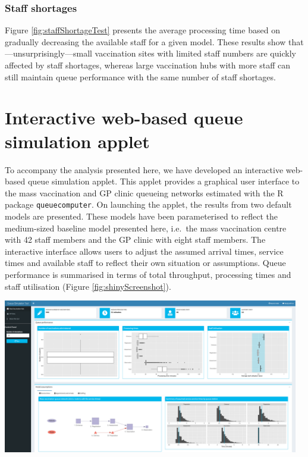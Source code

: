 \documentclass{article}
\let\origfigure\figure
\let\endorigfigure\endfigure
\renewenvironment{figure}[1][2] {
    \expandafter\origfigure\expandafter[H]
} {
    \endorigfigure
}
\begin{document}
\hypertarget{staff-shortages}{%
\subsubsection{Staff shortages}\label{staff-shortages}}

Figure \ref{fig:staffShortageTest} presents the average processing time
based on gradually decreasing the available staff for a given model.
These results show that---unsurprisingly---small vaccination sites with
limited staff numbers are quickly affected by staff shortages, whereas
large vaccination hubs with more staff can still maintain queue
performance with the same number of staff shortages.

\hypertarget{interactive-web-based-queue-simulation-applet}{%
\section{Interactive web-based queue simulation
applet}\label{interactive-web-based-queue-simulation-applet}}

To accompany the analysis presented here, we have developed an
interactive web-based queue simulation applet. This applet provides a
graphical user interface to the mass vaccination and GP clinic queueing
networks estimated with the R package \texttt{queuecomputer}. On
launching the applet, the results from two default models are presented.
These models have been parameterised to reflect the medium-sized
baseline model presented here, i.e.~the mass vaccination centre with 42
staff members and the GP clinic with eight staff members. The
interactive interface allows users to adjust the assumed arrival times,
service times and available staff to reflect their own situation or
assumptions. Queue performance is summarised in terms of total
throughput, processing times and staff utilisation (Figure
\ref{fig:shinyScreenshot}).

\begin{figure}

{\centering \includegraphics[width=5.09in]{../Data/queue-sim-tool-screenshot} 

}

\caption{Screenshot of the interactive web-based queue simulation applet}\label{fig:shinyScreenshot}
\end{figure}
\end{document}
